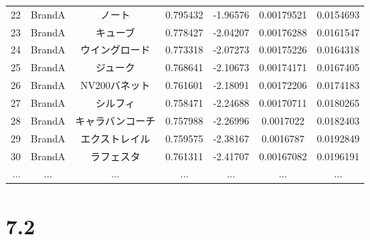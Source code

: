 \documentclass[
  letterpaper,
  DIV=11,
  numbers=noendperiod]{scrreprt}
\begin{document}
\begin{tabular}{r|cccccc}
    22 & BrandA & ノート & 0.795432 & -1.96576 & 0.00179521 & 0.0154693 \\
    23 & BrandA & キューブ & 0.778427 & -2.04207 & 0.00176288 & 0.0161547 \\
    24 & BrandA & ウイングロード & 0.773318 & -2.07273 & 0.00175226 & 0.0164318 \\
    25 & BrandA & ジューク & 0.768641 & -2.10673 & 0.00174171 & 0.0167405 \\
    26 & BrandA & NV200バネット & 0.761601 & -2.18091 & 0.00172206 & 0.0174183 \\
    27 & BrandA & シルフィ & 0.758471 & -2.24688 & 0.00170711 & 0.0180265 \\
    28 & BrandA & キャラバンコーチ & 0.757988 & -2.26996 & 0.0017022 & 0.0182403 \\
    29 & BrandA & エクストレイル & 0.759575 & -2.38167 & 0.0016787 & 0.0192849 \\
    30 & BrandA & ラフェスタ & 0.761311 & -2.41707 & 0.00167082 & 0.0196191 \\
    $\dots$ & $\dots$ & $\dots$ & $\dots$ & $\dots$ & $\dots$ & $\dots$ \\
\end{tabular}

\hypertarget{section-15}{%
\section{7.2}\label{section-15}}
\end{document}
